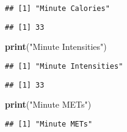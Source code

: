 \documentclass[
]{article}
\newenvironment{Shaded}{\begin{snugshade}}{\end{snugshade}}
\newcommand{\FunctionTok}[1]{\textcolor[rgb]{0.13,0.29,0.53}{\textbf{#1}}}
\newcommand{\NormalTok}[1]{#1}
\newcommand{\SpecialCharTok}[1]{\textcolor[rgb]{0.81,0.36,0.00}{\textbf{#1}}}
\newcommand{\StringTok}[1]{\textcolor[rgb]{0.31,0.60,0.02}{#1}}
\begin{document}
\begin{verbatim}
## [1] "Minute Calories"
\end{verbatim}

\begin{Shaded}
\end{Shaded}

\begin{verbatim}
## [1] 33
\end{verbatim}

\begin{Shaded}
\begin{Highlighting}[]
\FunctionTok{print}\NormalTok{(}\StringTok{"Minute Intensities"}\NormalTok{)}
\end{Highlighting}
\end{Shaded}

\begin{verbatim}
## [1] "Minute Intensities"
\end{verbatim}

\begin{Shaded}
\end{Shaded}

\begin{verbatim}
## [1] 33
\end{verbatim}

\begin{Shaded}
\begin{Highlighting}[]
\FunctionTok{print}\NormalTok{(}\StringTok{"Minute METs"}\NormalTok{)}
\end{Highlighting}
\end{Shaded}

\begin{verbatim}
## [1] "Minute METs"
\end{verbatim}

\begin{Shaded}
\end{Shaded}
\end{document}
